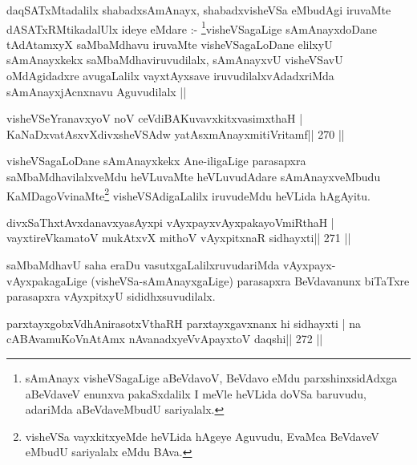 \begin{artha}
daqSATxMtadalilx shabadxsAmAnayx, shabadxvisheVSa eMbudAgi iruvaMte dASATxRMtika\-dalUlx ideye eMdare :- \footnote[1]{sAmAnayx visheVSagaLige aBeVdavoV, BeVdavo eMdu parxshinxsidAdxga aBeVdaveV enunxva pakaSxdalilx I meVle heVLida doVSa baruvudu, adariMda aBeVdaveMbudU sariyalalx.}visheVSagaLige sAmAnayxdoDane tAdAtamxyX saMbaMdhavu iruvaMte visheVSagaLoDane elilxyU sAmAnayxkekx saMbaMdhaviruvudilalx, sAmAnayx\-vU visheVSavU oMdAgidadxre avugaLalilx vayxtAyxsave iruvudilalxvAdadxriMda sAmAnayxjAcnxnavu Aguvudilalx || 
\end{artha}


\begin{shl}
visheVSeYranavxyoV noV ceVdiBAKuvavxkitxvasimxthaH |
KaNaDxvatAsxvXdivxsheVSAdw yatAsxmAnayxmitiVritamf\hfill || 270 ||
\end{shl}

\begin{artha}
visheVSagaLoDane sAmAnayxkekx Ane-iligaLige parasapxra saMbaMdhavilalxveMdu heVLu\-vaMte heVLuvudAdare sAmAnayxveMbudu KaMDagoVvinaMte\footnote[2]{visheVSa vayxkitxyeMde heVLida hAgeye Aguvudu, EvaMca BeVdaveV eMbudU sariyalalx eMdu BAva.} visheVSAdigaLalilx \-iruvudeMdu heVLida hAgAyitu.
\end{artha}


\begin{shl}
divxSaThxtAvxdanavxyasAyxpi vAyxpayxvAyxpakayoVmiRthaH |
vayxtireVkamatoV mukAtxvX mithoV vAyxpitxnaR sidhayxti\hfill || 271 ||
\end{shl}

\begin{artha}
saMbaMdhavU saha eraDu vasutxgaLalilxruvudariMda vAyxpayx-vAyxpakagaLige (visheVSa-\-sAmAnayxgaLige) parasapxra BeVdavanunx biTaTxre parasapxra vAyxpitxyU sididhxsuvudilalx.
\end{artha}

\begin{shl}
parxtayxgobxVdhAnirasotxV\s thaRH parxtayxgavxnanx hi sidhayxti |
na cABAvamuKoV\s nAtAmx nAvanadxyeVvApayxtoV daqshi\hfill || 272 ||
\end{shl}

